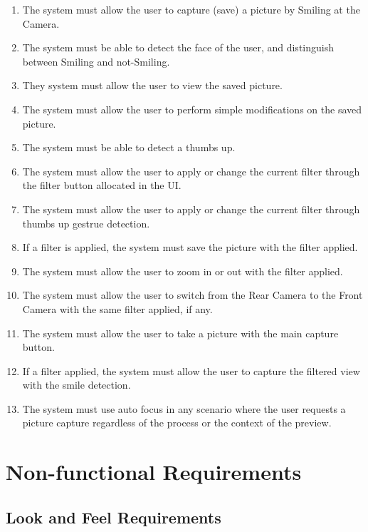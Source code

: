 \documentclass[12pt, titlepage]{article}
\begin{document}
{\color{red}
\begin{enumerate}[{REQ}1.]
\item The system must allow the user to capture (save) a picture by Smiling at the Camera.
\item The system must be able to detect the face of the user, and distinguish between Smiling and not-Smiling.
\item They system must allow the user to view the saved picture. 
\item The system must allow the user to perform simple modifications on the saved picture. 
\item The system must be able to detect a thumbs up. 
\item The system must allow the user to apply or change the current filter through the filter button allocated in the UI. 
\item The system must allow the user to apply or change the current filter through thumbs up gestrue detection.
\item If a filter is applied, the system must save the picture with the filter applied.
\item The system must allow the user to zoom in or out with the filter applied.
\item The system must allow the user to switch from the Rear Camera to the Front Camera with the same filter applied, if any. 
\item The system must allow the user to take a picture with the main capture button.
\item If a filter applied, the system must allow the user to capture the filtered view with the smile detection. 
\item The system must use auto focus in any scenario where the user requests a picture capture regardless of the process or the context of the preview.
\end{enumerate}
}

\section{Non-functional Requirements}



\subsection{Look and Feel Requirements}
\end{document}
